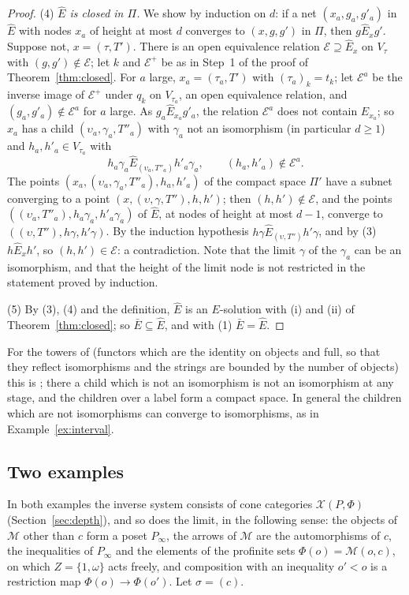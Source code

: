 \documentclass[11pt]{amsart}
\theoremstyle{definition}
\newcommand{\cX}{\mathcal X}
\newcommand{\cM}{\mathcal M}
\begin{document}
\begin{proof}
(4) \emph{$\widehat E$ is closed in $\Pi$.} We show by induction on
$d$: if a net $(x_a,g_a,g'_a)$ in $\widehat E$ with nodes $x_a$ of
height at most $d$ converges to $(x,g,g')$ in $\Pi$, then
$g\mathrel{\widehat E_x}g'$. Suppose not, $x=(\tau,T')$. There is an
open equivalence relation $\mathcal E\supseteq\widehat E_x$ on
$V_\tau$ with $(g,g')\notin\mathcal E$; let $k$ and $\mathcal E^+$ be
as in Step~1 of the proof of Theorem~\ref{thm:closed}. For $a$ large,
$x_a=(\tau_a,T')$ with $(\tau_a)_k=t_k$; let $\mathcal E^a$ be the
inverse image of $\mathcal E^+$ under $q_k$ on $V_{\tau_a}$, an open
equivalence relation, and $(g_a,g'_a)\notin\mathcal E^a$ for $a$
large. As $g_a\mathrel{\widehat E_{x_a}}g'_a$, the relation $\mathcal
E^a$ does not contain $\widehat E_{x_a}$; so $x_a$ has a child
$(\upsilon_a,\gamma_a,T''_a)$ with $\gamma_a$ not an isomorphism (in
particular $d\ge1$) and $h_a,h'_a\in V_{\tau_a}$ with
\[
h_a\gamma_a\mathrel{\widehat E_{(\upsilon_a,T''_a)}}h'_a\gamma_a,
\qquad(h_a,h'_a)\notin\mathcal E^a.
\]
The points $(x_a,(\upsilon_a,\gamma_a,T''_a),h_a,h'_a)$ of the
compact space $\Pi'$ have a subnet converging to a point
$(x,(\upsilon,\gamma,T''),h,h')$; then $(h,h')\notin\mathcal E$, and
the points $((\upsilon_a,T''_a),h_a\gamma_a,h'_a\gamma_a)$ of
$\widehat E$, at nodes of height at most $d-1$, converge to
$((\upsilon,T''),h\gamma,h'\gamma)$. By the induction hypothesis
$h\gamma\mathrel{\widehat E_{(\upsilon,T'')}}h'\gamma$, and by (3)
$h\mathrel{\widehat E_x}h'$, so $(h,h')\in\mathcal E$: a
contradiction. Note that the limit $\gamma$ of the $\gamma_a$ can be
an isomorphism, and that the height of the limit node is not
restricted in the statement proved by induction.

(5) By (3), (4) and the definition, $\widehat E$ is an $E$-solution
with (i) and (ii) of Theorem~\ref{thm:closed}; so $\bar
E\subseteq\widehat E$, and with (1) $\bar E=\widehat E$.
\end{proof}

For the towers of \cite[\S7]{Proftrees} (functors which are the
identity on objects and full, so that they reflect isomorphisms and
the strings are bounded by the number of objects) this is
\cite[Prop.~8.3]{Proftrees}; there a child which is not an
isomorphism is not an isomorphism at any stage, and the children over
a label form a compact space. In general the children which are not
isomorphisms can converge to isomorphisms, as in
Example~\ref{ex:interval}.

\subsection*{Two examples}
In both examples the inverse system consists of cone categories
$\cX(P,\Phi)$ (Section~\ref{sec:depth}), and so does the limit, in
the following sense: the objects of $\cM$ other than $c$ form a poset
$P_\infty$, the arrows of $\cM$ are the automorphisms of $c$, the
inequalities of $P_\infty$ and the elements of the profinite sets
$\Phi(o)=\cM(o,c)$, on which $Z=\{1,\omega\}$ acts freely, and
composition with an inequality $o'<o$ is a restriction map
$\Phi(o)\to\Phi(o')$. Let $\sigma=(c)$.
\end{document}
